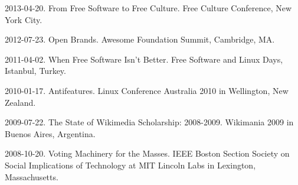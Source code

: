 \documentclass[10pt]{article}
\newenvironment{cvlist}{
\begin{list}{}{\leftmargin=3.0em \itemindent=-3.0em}
  \setlength{\itemsep}{0pt}
  \setlength{\parskip}{0em}
  \setlength{\parsep}{1em}
  \setlength{\parindent}{0em}}
{\vspace{1em}
\end{list}}
\begin{document}
\begin{cvlist}
\item 2013-04-20. From Free Software to Free Culture. Free Culture Conference, New York City.
\item 2012-07-23. Open Brands. Awesome Foundation Summit, Cambridge, MA.
\item 2011-04-02. When Free Software Isn't Better. Free Software and Linux Days, Istanbul, Turkey.
\item 2010-01-17. Antifeatures. Linux Conference Australia 2010 in Wellington, New Zealand. %
\item 2009-07-22. The State of Wikimedia Scholarship: 2008-2009. Wikimania 2009 in Buenos Aires, Argentina.
\item 2008-10-20. Voting Machinery for the Masses. IEEE Boston Section Society on Social Implications of Technology at MIT Lincoln Labs in Lexington, Massachusetts.

\end{cvlist}
\end{document}
